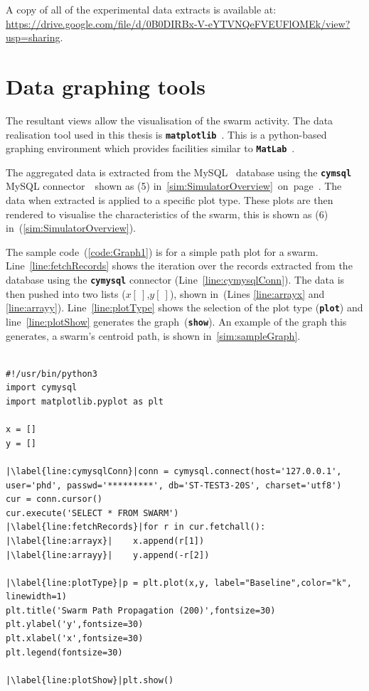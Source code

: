A copy of all of the experimental data extracts is available at: \url{https://drive.google.com/file/d/0B0DIRBx-V-eYTVNQeFVEUFlOMEk/view?usp=sharing}.

\section{Data graphing tools}\label{sim:GraphingTools}
The resultant views allow the visualisation of the swarm activity. The data realisation tool used in this thesis is \texttt{\textbf{matplotlib}}~\cite{JH:16}. This is a python-based graphing environment which provides facilities similar to \texttt{\textbf{MatLab}}~\cite{MATLAB:94}. 

The aggregated data is extracted from the MySQL~\cite{OC:16} database using the \texttt{\textbf{cymsql}} MySQL connector~\cite{PSF:15}~shown as (5) in~\autoref{sim:SimulatorOverview}~on~page~\pageref{sim:SimulatorOverview}. The data when extracted is applied to a specific plot type. These plots are then rendered to visualise the characteristics of the swarm, this is shown as (6) in~(\autoref{sim:SimulatorOverview}).

The sample code~(\autoref{code:Graph1}) is for a simple path plot for a swarm. Line~\autoref{line:fetchRecords} shows the iteration over the records extracted from the database using the \texttt{\textbf{cymysql}} connector (Line~\autoref{line:cymysqlConn}). The data is then pushed into two lists ($x[~]$,$y[~]$), shown in~(Lines \autoref{line:arrayx} and \autoref{line:arrayy}). Line~\autoref{line:plotType} shows the selection of the plot type (\texttt{\textbf{plot}}) and line~\autoref{line:plotShow} generates the graph~(\texttt{\textbf{show}}). An example of the graph this generates, a swarm's centroid path, is shown in~\autoref{sim:sampleGraph}. 

\begin{lstlisting}[label={code:Graph1}]  % Start your code-block

#!/usr/bin/python3
import cymysql
import matplotlib.pyplot as plt

x = []
y = []

|\label{line:cymysqlConn}|conn = cymysql.connect(host='127.0.0.1', user='phd', passwd='*********', db='ST-TEST3-20S', charset='utf8')
cur = conn.cursor()
cur.execute('SELECT * FROM SWARM')
|\label{line:fetchRecords}|for r in cur.fetchall():
|\label{line:arrayx}|    x.append(r[1])
|\label{line:arrayy}|    y.append(-r[2])

|\label{line:plotType}|p = plt.plot(x,y, label="Baseline",color="k", linewidth=1)
plt.title('Swarm Path Propagation (200)',fontsize=30)
plt.ylabel('y',fontsize=30)
plt.xlabel('x',fontsize=30)
plt.legend(fontsize=30)

|\label{line:plotShow}|plt.show()
\end{lstlisting}

